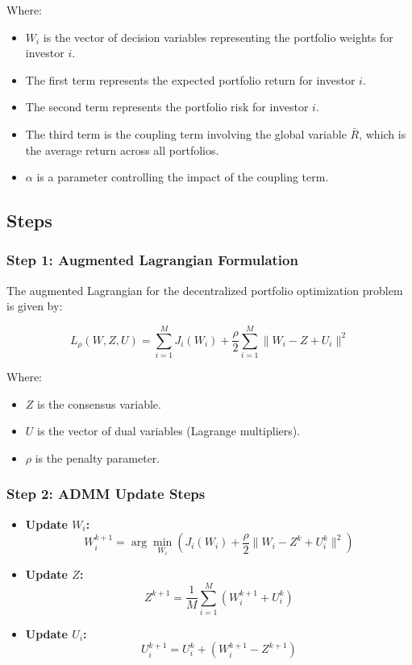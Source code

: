\documentclass{article}
\begin{document}
	Where:
	\begin{itemize}
		\item $W_i$ is the vector of decision variables representing the portfolio weights for investor $i$.
		\item The first term represents the expected portfolio return for investor $i$.
		\item The second term represents the portfolio risk for investor $i$.
		\item The third term is the coupling term involving the global variable $\bar{R}$, which is the average return across all portfolios.
		\item $\alpha$ is a parameter controlling the impact of the coupling term.
	\end{itemize}
	
	\subsection*{Steps}
	
	\subsubsection*{Step 1: Augmented Lagrangian Formulation}
	
	The augmented Lagrangian for the decentralized portfolio optimization problem is given by:
	
	\[
	L_\rho(W, Z, U) = \sum_{i=1}^{M} J_i(W_i) + \frac{\rho}{2} \sum_{i=1}^{M} \|W_i - Z + U_i\|^2
	\]
	
	Where:
	\begin{itemize}
		\item $Z$ is the consensus variable.
		\item $U$ is the vector of dual variables (Lagrange multipliers).
		\item $\rho$ is the penalty parameter.
	\end{itemize}
	
	\subsubsection*{Step 2: ADMM Update Steps}
	
	\begin{itemize}
		\item \textbf{Update $W_i$:}
		\[
		W_i^{k+1} = \arg\min_{W_i} \left(J_i(W_i) + \frac{\rho}{2} \|W_i - Z^k + U_i^k\|^2\right)
		\]
		
		\item \textbf{Update $Z$:}
		\[
		Z^{k+1} = \frac{1}{M} \sum_{i=1}^{M} (W_i^{k+1} + U_i^k)
		\]
		
		\item \textbf{Update $U_i$:}
		\[
		U_i^{k+1} = U_i^k + (W_i^{k+1} - Z^{k+1})
		\]
	\end{itemize}
	
\end{document}
